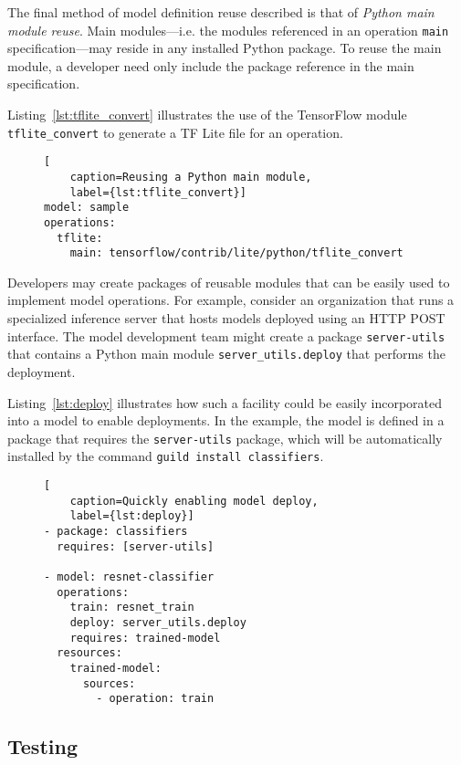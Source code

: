 \documentclass{article}
\begin{document}
The final method of model definition reuse described is that of
\emph{Python main module reuse}. Main modules---i.e. the modules
referenced in an operation \verb|main| specification---may reside in
any installed Python package. To reuse the main module, a developer
need only include the package reference in the main specification.

Listing~\ref{lst:tflite_convert} illustrates the use of the TensorFlow
module \verb|tflite_convert| to generate a TF Lite file for an
operation.

\begin{figure}
\begin{lstlisting}[
    caption=Reusing a Python main module,
    label={lst:tflite_convert}]
model: sample
operations:
  tflite:
    main: tensorflow/contrib/lite/python/tflite_convert
\end{lstlisting}
\end{figure}

Developers may create packages of reusable modules that can be easily
used to implement model operations. For example, consider an
organization that runs a specialized inference server that hosts
models deployed using an HTTP POST interface. The model development
team might create a package \verb|server-utils| that contains a Python
main module \verb|server_utils.deploy| that performs the
deployment.

Listing~\ref{lst:deploy} illustrates how such a facility could be
easily incorporated into a model to enable deployments. In the
example, the model is defined in a package that requires the
\verb|server-utils| package, which will be automatically installed by
the command \verb|guild install classifiers|.

\begin{figure}
\begin{lstlisting}[
    caption=Quickly enabling model deploy,
    label={lst:deploy}]
- package: classifiers
  requires: [server-utils]

- model: resnet-classifier
  operations:
    train: resnet_train
    deploy: server_utils.deploy
    requires: trained-model
  resources:
    trained-model:
      sources:
        - operation: train
\end{lstlisting}
\end{figure}

\subsection{Testing}
\end{document}

